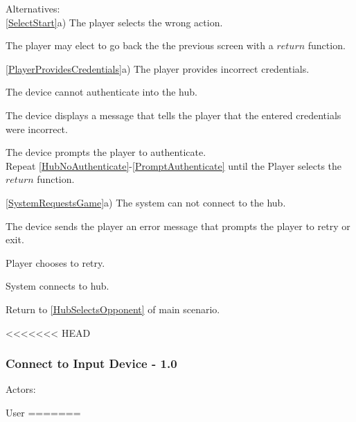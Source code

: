 \documentclass[12pt]{article}
\newenvironment{itemize*}%
  {\begin{itemize}%
  	\setlength{\parsep}{0pt}
    \setlength{\itemsep}{0pt}%
    \setlength{\parskip}{0pt}}%
  {\end{itemize}}
\newenvironment{enumerate*}%
  {\begin{enumerate}%
  	\setlength{\parsep}{0pt}
    \setlength{\itemsep}{0pt}%
    \setlength{\parskip}{0pt}}%
  {\end{enumerate}}
\begin{document}
\begin{itemize*}
\begin{enumerate*}
\end{enumerate*}
Alternatives:\\
\ref{SelectStart}a) The player selects the wrong action.
\begin{enumerate*}
\item The player may elect to go back the the previous screen with a $return$ function.
\end{enumerate*}
\ref{PlayerProvidesCredentials}a) The player provides incorrect credentials.
\begin{enumerate*}
\item \label{HubNoAuthenticate}The device cannot authenticate into the hub.
\item The device displays a message that tells the player that the entered credentials were incorrect.
\item \label{PromptAuthenticate}The device prompts the player to authenticate.\\
Repeat \ref{HubNoAuthenticate}-\ref{PromptAuthenticate} until the Player selects the $return$ function.
\end{enumerate*}
\ref{SystemRequestsGame}a) The system can not connect to the hub.
\begin{enumerate*}
\item The device sends the player an error message that prompts the player to retry or exit.
\item Player chooses to retry.
\item System connects to hub.
\item Return to \ref{HubSelectsOpponent} of main scenario.
\end{enumerate*}
<<<<<<< HEAD
\subsubsection*{Connect to Input Device - 1.0}
Actors:
\begin{itemize*}
\item User
=======

\end{itemize*}
\end{itemize*}
\end{document}
